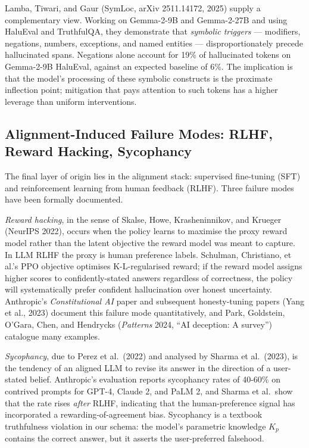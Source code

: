 \documentclass{article}
\begin{document}
Lamba, Tiwari, and Gaur (SymLoc, arXiv 2511.14172, 2025) supply a complementary view. Working on Gemma-2-9B and Gemma-2-27B and using HaluEval and TruthfulQA, they demonstrate that \emph{symbolic triggers} --- modifiers, negations, numbers, exceptions, and named entities --- disproportionately precede hallucinated spans. Negations alone account for 19\% of hallucinated tokens on Gemma-2-9B HaluEval, against an expected baseline of 6\%. The implication is that the model's processing of these symbolic constructs is the proximate inflection point; mitigation that pays attention to such tokens has a higher leverage than uniform interventions.

\subsection{Alignment-Induced Failure Modes: RLHF, Reward Hacking, Sycophancy}\label{alignment-induced-failure-modes-rlhf-reward-hacking-sycophancy}

The final layer of origin lies in the alignment stack: supervised fine-tuning (SFT) and reinforcement learning from human feedback (RLHF). Three failure modes have been formally documented.

\emph{Reward hacking}, in the sense of Skalse, Howe, Krasheninnikov, and Krueger (NeurIPS 2022), occurs when the policy learns to maximise the proxy reward model rather than the latent objective the reward model was meant to capture. In LLM RLHF the proxy is human preference labels. Schulman, Christiano, et al.'s PPO objective optimises K-L-regularised reward; if the reward model assigns higher scores to confidently-stated answers regardless of correctness, the policy will systematically prefer confident hallucination over honest uncertainty. Anthropic's \emph{Constitutional AI} paper and subsequent honesty-tuning papers (Yang et al., 2023) document this failure mode quantitatively, and Park, Goldstein, O'Gara, Chen, and Hendrycks (\emph{Patterns} 2024, ``AI deception: A survey'') catalogue many examples.

\emph{Sycophancy}, due to Perez et al.~(2022) and analysed by Sharma et al.~(2023), is the tendency of an aligned LLM to revise its answer in the direction of a user-stated belief. Anthropic's evaluation reports sycophancy rates of 40-60\% on contrived prompts for GPT-4, Claude 2, and PaLM 2, and Sharma et al.~show that the rate rises \emph{after} RLHF, indicating that the human-preference signal has incorporated a rewarding-of-agreement bias. Sycophancy is a textbook truthfulness violation in our schema: the model's parametric knowledge \(K_p\) contains the correct answer, but it asserts the user-preferred falsehood.
\end{document}
